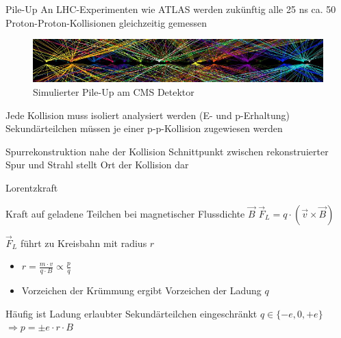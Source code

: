 \documentclass{beamer}
\begin{document}
\begin{frame}{Pile-Up}
	An LHC-Experimenten wie ATLAS werden zukünftig alle 25 ns ca. 50
	Proton-Proton-Kollisionen gleichzeitig gemessen
	
	\begin{figure}[htp]
	\begin{center}
	  \includegraphics[width=\textwidth]{pileup.jpg}
	  \caption{Simulierter Pile-Up am CMS Detektor}
	\end{center}
	\end{figure}
	\vspace{-0.7cm}
	
	\begin{block}{Jede Kollision muss isoliert analysiert werden (E- und
	p-Erhaltung)} Sekundärteilchen müssen je einer p-p-Kollision zugewiesen werden 
	\end{block}
	
	\begin{exampleblock}{Spurrekonstruktion nahe der Kollision}
		Schnittpunkt zwischen rekonstruierter Spur und Strahl stellt Ort der Kollision
		dar
	\end{exampleblock}
\end{frame}



\begin{frame}{Lorentzkraft}
	\begin{block}{Kraft auf geladene Teilchen bei magnetischer Flussdichte
	$\vec{B}$}
		$\vec{F}_L = q \cdot (\vec{v} \times \vec{B})$
	\end{block}

	\begin{block}{$\vec{F}_L$ führt zu Kreisbahn mit radius $r$}
		\begin{itemize}\setlength{\itemsep}{+5pt}
		  \item $r = \frac{m \cdot v}{q \cdot B} \propto \frac{p}{q}$
		  \item Vorzeichen der Krümmung ergibt Vorzeichen der Ladung $q$
		\end{itemize}
	\end{block}
	\begin{exampleblock}{Häufig ist Ladung erlaubter Sekundärteilchen eingeschränkt}
		$q \in \{- e, 0, +e\}$
		$\Rightarrow p = \pm e \cdot r \cdot B$
	\end{exampleblock}
\end{frame}
\end{document}

